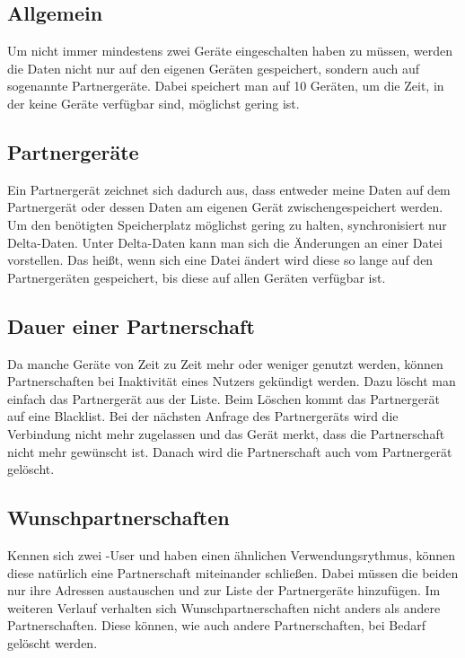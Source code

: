\subsection{Allgemein}
Um nicht immer mindestens zwei Geräte eingeschalten haben zu müssen, werden die Daten nicht nur auf den eigenen Geräten gespeichert, sondern auch auf sogenannte Partnergeräte. Dabei speichert man auf 10 Geräten, um die Zeit, in der keine Geräte verfügbar sind, möglichst gering ist.

\subsection{Partnergeräte} \label{Partnergerät}
Ein Partnergerät zeichnet sich dadurch aus, dass entweder meine Daten auf dem Partnergerät oder dessen Daten am eigenen Gerät zwischengespeichert werden. Um den benötigten Speicherplatz möglichst gering zu halten, synchronisiert \sblit nur Delta-Daten. Unter Delta-Daten kann man sich die Änderungen an einer Datei vorstellen. Das heißt, wenn sich eine Datei ändert wird diese so lange auf den Partnergeräten gespeichert, bis diese auf allen Geräten verfügbar ist.

\subsection{Dauer einer Partnerschaft}
Da manche Geräte von Zeit zu Zeit mehr oder weniger genutzt werden, können Partnerschaften bei Inaktivität eines Nutzers gekündigt werden. Dazu löscht man einfach das Partnergerät aus der Liste. Beim Löschen kommt das Partnergerät auf eine Blacklist. Bei der nächsten Anfrage des Partnergeräts wird die Verbindung nicht mehr zugelassen und das Gerät merkt, dass die Partnerschaft nicht mehr gewünscht ist. Danach wird die Partnerschaft auch vom Partnergerät gelöscht.

\subsection{Wunschpartnerschaften}
Kennen sich zwei \sblit-User und haben einen ähnlichen Verwendungsrythmus, können diese natürlich eine Partnerschaft miteinander schließen. Dabei müssen die beiden nur ihre Adressen austauschen und zur Liste der Partnergeräte hinzufügen. Im weiteren Verlauf verhalten sich Wunschpartnerschaften nicht anders als andere Partnerschaften. Diese können, wie auch andere Partnerschaften, bei Bedarf gelöscht werden.


